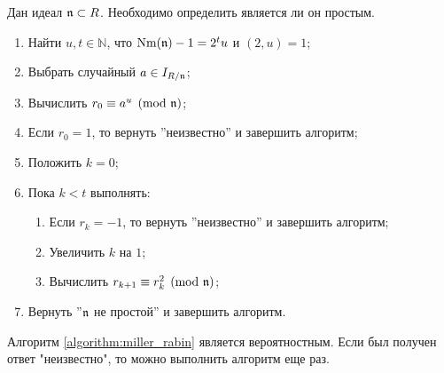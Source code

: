 \documentclass[_00_dissertation.tex]{subfiles}
\begin{document}
\begin{algorithm}\label{algorithm:miller_rabin}
    Дан идеал $\mathfrak{n} \subset R$.
    Необходимо определить является ли он простым.

    \begin{enumerate}
        \item Найти $u, t \in \mathbb{N}$, что $\textrm{Nm}(\mathfrak{n}) - 1 = 2^t u$ и $(2, u) = 1$;
        
        \item Выбрать случайный $a \in I_{R/\mathfrak{n}}$;

        \item Вычислить $r_0 \equiv a^u \pmod{\mathfrak{n}}$;

        \item Если $r_0 = 1$, то вернуть ''неизвестно'' и завершить алгоритм;

        \item Положить $k = 0$;

        \item Пока $k < t$ выполнять:
        \begin{enumerate}
            \item Если $r_k = -1$, то вернуть ''неизвестно'' и завершить алгоритм;

            \item Увеличить $k$ на $1$;

            \item Вычислить $r_{k+1} \equiv r_k^2 \pmod{\mathfrak{n}}$;
        \end{enumerate}

        \item Вернуть ''$\mathfrak{n}$ не простой'' и завершить алгоритм.
    \end{enumerate}
\end{algorithm}

\begin{remark}
    Алгоритм \ref{algorithm:miller_rabin} является вероятностным.
    Если был получен ответ "неизвестно", то можно выполнить алгоритм еще раз.
\end{remark}
\end{document}
